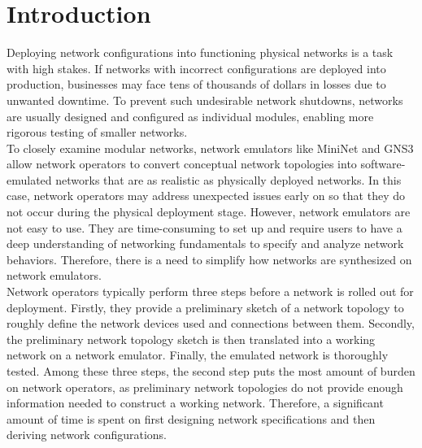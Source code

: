 \documentclass{uiucthesis2021}
\begin{document}
\mainmatter

\chapter{Introduction}
\noindent Deploying network configurations into functioning physical networks is a task with high stakes. If networks with incorrect configurations are deployed into production, businesses may face tens of thousands of dollars in losses due to unwanted downtime. To prevent such undesirable network shutdowns, networks are usually designed and configured as individual modules, enabling more rigorous testing of smaller networks.\\

\noindent To closely examine modular networks, network emulators like MiniNet and GNS3 allow network operators to convert conceptual network topologies into software-emulated networks that are as realistic as physically deployed networks. In this case, network operators may address unexpected issues early on so that they do not occur during the physical deployment stage. However, network emulators are not easy to use. They are time-consuming to set up and require users to have a deep understanding of networking fundamentals to specify and analyze network behaviors. Therefore, there is a need to simplify how networks are synthesized on network emulators.\\

\noindent Network operators typically perform three steps before a network is rolled out for deployment. Firstly, they provide a preliminary sketch of a network topology to roughly define the network devices used and connections between them. Secondly, the preliminary network topology sketch is then translated into a working network on a network emulator. Finally, the emulated network is thoroughly tested. Among these three steps, the second step puts the most amount of burden on network operators, as preliminary network topologies do not provide enough information needed to construct a working network. Therefore, a significant amount of time is spent on first designing network specifications and then deriving network configurations.\\
\end{document}
